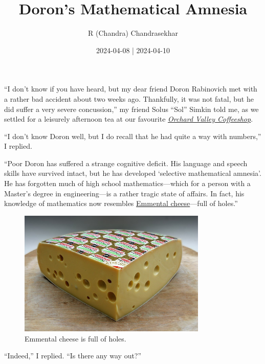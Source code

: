 \documentclass[
  a4paper,
]{article}
\title{Doron's Mathematical Amnesia}
\author{R (Chandra) Chandrasekhar}
\date{2024-04-08 | 2024-04-10}
\begin{document}
\maketitle

\thispagestyle{empty}


``I don't know if you have heard, but my dear friend Doron Rabinovich
met with a rather bad accident about two weeks ago. Thankfully, it was
not fatal, but he did suffer a very severe concussion,'' my friend Solus
``Sol'' Simkin told me, as we settled for a leisurely afternoon tea at
our favourite \href{http://www.orchardvalleycoffee.net/}{\emph{Orchard
Valley Coffeeshop}}.

``I don't know Doron well, but I do recall that he had quite a way with
numbers,'' I replied.

``Poor Doron has suffered a strange cognitive deficit. His language and
speech skills have survived intact, but he has developed `selective
mathematical amnesia'. He has forgotten much of high school
mathematics---which for a person with a Master's degree in
engineering---is a rather tragic state of affairs. In fact, his
knowledge of mathematics now resembles
\href{https://en.wikipedia.org/wiki/Emmental_cheese}{Emmental
cheese}---full of holes.''

\begin{figure}
\centering
\includegraphics[width=0.8\textwidth,height=\textheight]{images/Emmentaler_Premier_Cru.jpg}
\caption[Emmental cheese is full of holes.]{Emmental cheese is full of
holes.\footnotemark{}}\label{fig:cheese}
\end{figure}

``Indeed,'' I replied. ``Is there any way out?''
\end{document}
